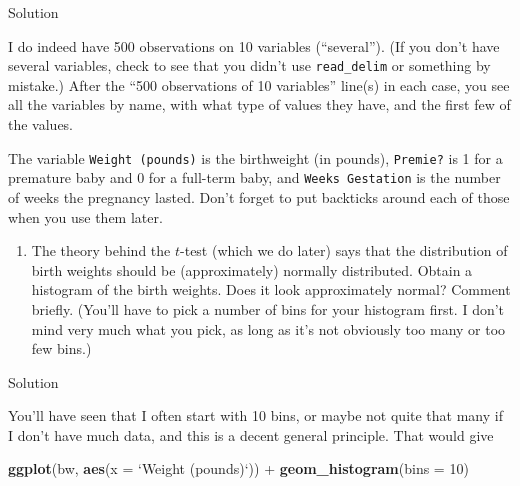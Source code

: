 \documentclass[]{tufte-book}
\newenvironment{Shaded}{}{}
\newcommand{\DataTypeTok}[1]{\textcolor[rgb]{0.56,0.13,0.00}{#1}}
\newcommand{\DecValTok}[1]{\textcolor[rgb]{0.25,0.63,0.44}{#1}}
\newcommand{\KeywordTok}[1]{\textcolor[rgb]{0.00,0.44,0.13}{\textbf{#1}}}
\newcommand{\NormalTok}[1]{#1}
\newcommand{\OperatorTok}[1]{\textcolor[rgb]{0.40,0.40,0.40}{#1}}
\newcommand{\StringTok}[1]{\textcolor[rgb]{0.25,0.44,0.63}{#1}}
\providecommand{\tightlist}{%
  \setlength{\itemsep}{0pt}\setlength{\parskip}{0pt}}
\theoremstyle{definition}
\theoremstyle{definition}
\theoremstyle{definition}
\theoremstyle{remark}
\begin{document}
Solution

I do indeed have 500 observations on 10 variables (``several''). (If you
don't have several variables, check to see that you didn't use
\texttt{read\_delim} or something by mistake.) After the ``500
observations of 10 variables'' line(s) in each case, you see all the
variables by name, with what type of values they have,
 and the first few
of the values.

The variable \texttt{Weight\ (pounds)} is the birthweight (in pounds),
\texttt{Premie?} is 1 for a premature baby and 0 for a full-term baby,
and \texttt{Weeks\ Gestation} is the number of weeks the pregnancy
lasted. Don't forget to put backticks around each of those when you use
them later.

\begin{enumerate}
\def\labelenumi{(\alph{enumi})}
\setcounter{enumi}{2}
\tightlist
\item
  The theory behind the \(t\)-test (which we do later) says that the
  distribution of birth weights should be (approximately) normally
  distributed. Obtain a histogram of the birth weights. Does it look
  approximately normal? Comment briefly. (You'll have to pick a number
  of bins for your histogram first. I don't mind very much what you
  pick, as long as it's not obviously too many or too few bins.)
\end{enumerate}

Solution

You'll have seen that I often start with 10 bins, or maybe not quite
that many if I don't have much data, and this is a decent general
principle. That would give

\begin{Shaded}
\begin{Highlighting}[]
\KeywordTok{ggplot}\NormalTok{(bw, }\KeywordTok{aes}\NormalTok{(}\DataTypeTok{x =} \StringTok{`}\DataTypeTok{Weight (pounds)}\StringTok{`}\NormalTok{)) }\OperatorTok{+}\StringTok{ }\KeywordTok{geom_histogram}\NormalTok{(}\DataTypeTok{bins =} \DecValTok{10}\NormalTok{)}
\end{Highlighting}
\end{Shaded}
\end{document}
